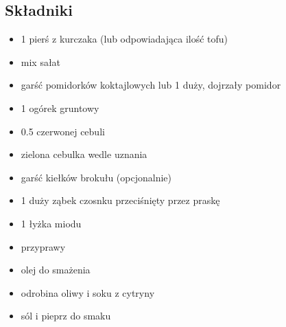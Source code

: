 \documentclass[a4paper,10pt]{book}
\begin{document}
\begin{multicols}{2}

\subsection*{Składniki}
\begin{itemize}
    \item 1 pierś z kurczaka (lub odpowiadająca ilość tofu)
    \item mix sałat  
    \item garść pomidorków koktajlowych lub 1 duży, dojrzały pomidor
    \item 1 ogórek gruntowy 
    \item 0.5 czerwonej cebuli
    \item zielona cebulka wedle uznania 
    \item garść kiełków brokułu (opcjonalnie) 
    \item 1 duży ząbek czosnku przeciśnięty przez praskę 
    \item 1 łyżka miodu
    \item przyprawy
    \item olej do smażenia
    \item odrobina oliwy i soku z cytryny
    \item sól i pieprz do smaku
\end{itemize}

\columnbreak

\begin{figure}[H]
    \centering
\end{figure}
\end{multicols}

\vspace{0.5cm} 
\end{document}
